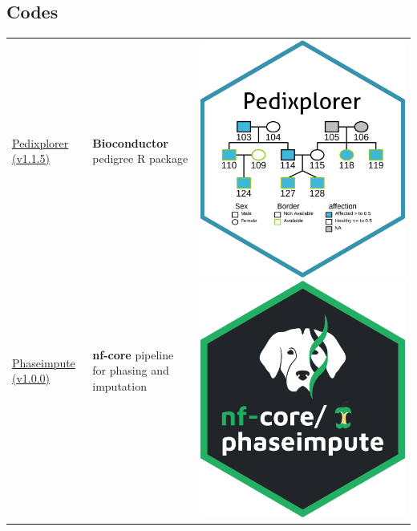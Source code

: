 \documentclass[11pt,a4paper]{moderncv}
\begin{document}
\subsection{Codes}
\begin{tabularx}{\textwidth}{p{} p{} p{}}
    &
    & \multirow{4}{*}{
        \begin{minipage}{0.2\textwidth} %
            \centering
            \href{https://www.bioconductor.org/packages/release/bioc/html/Pedixplorer.html}{\includegraphics[width=0.4\linewidth]{../img/pedixplorer/icon_pedixplorer.png}}
            \href{https://nf-co.re/phaseimpute}{\includegraphics[width=0.4\linewidth]{../img/phaseimpute/nf-core-phaseimpute_hexagonal_logo.png}}
        \end{minipage}
    } \\
    \href{https://www.bioconductor.org/packages/release/bioc/html/Pedixplorer.html}{Pedixplorer (v1.1.5)}
    & \textbf{Bioconductor} pedigree R package
    & \\
    \href{https://nf-co.re/phaseimpute}{Phaseimpute (v1.0.0)}
        & \textbf{nf-core} pipeline for phasing and imputation
        & \\
    & & \\
\end{tabularx}
\end{document}
